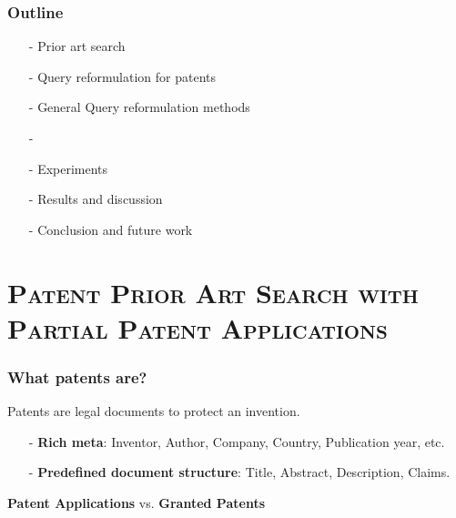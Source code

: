 \documentclass[xcolor=x11names,compress]{beamer}
\renewcommand{\(}{\begin{columns}}
\renewcommand{\)}{\end{columns}}
\newcommand{\<}[1]{\begin{column}{#1}}
\renewcommand{\>}{\end{column}}
\begin{document}


\begin{frame}
\frametitle{Outline}
\begin{itemize}
\item[-] Prior art search
\item[-] Query reformulation for patents
\item[-] General Query reformulation methods
\item[-]  
\item[-] Experiments 
\item[-] Results and discussion
\item[-] Conclusion and future work
\end{itemize}
\end{frame}

\section{\scshape Patent Prior Art Search with Partial Patent Applications}

\begin{frame}
\frametitle{What patents are?}

Patents are legal documents to protect an invention.

\begin{itemize}
\item[-] \textbf{Rich meta}: Inventor, Author, Company, Country, Publication year, etc.
\item[-] \textbf{Predefined document structure}: Title, Abstract, Description, Claims.		
\item[]
\end{itemize}

\begin{center}
\textbf{Patent Applications} vs. \textbf{Granted Patents}
\end{center}

\end{frame}
\end{document}
